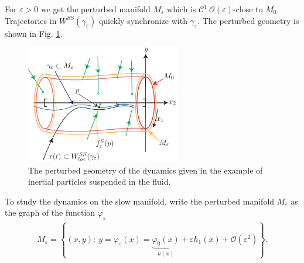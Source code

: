 \begin{ex}
For $\varepsilon>0$ we get the perturbed manifold $M_{\varepsilon}$ which is $\mathcal{C}^{1}\ \mathcal{O}(\varepsilon)$-close to $M_0$. Trajectories in $W^{SS}(\gamma_{\varepsilon})$ quickly synchronize with $\gamma_{\varepsilon}$. The perturbed geometry is shown in Fig. \ref{fig:perturbed_fluid_geometry}.

\begin{figure}[h!]
	\centering
	\includegraphics[width=0.6\textwidth]{figures/ch9/22perturbed_fluid_geometry.pdf}
	\caption{The perturbed geometry of the dynamics given in the example of inertial particles suspended in the fluid.}
	\label{fig:perturbed_fluid_geometry}
\end{figure}

To study the dynamics on the slow manifold, write the perturbed manifold $M_{\varepsilon}$ as the graph of the function $\varphi_{\varepsilon}$
\begin{align}
	M_{\varepsilon} = \left\{ (x,y):\ y=\varphi_{\varepsilon}(x)=\underbrace{\varphi_0(x)}_{u(x)} + \varepsilon h_{1}(x) + \mathcal{O}(\varepsilon^{2}) \right\}.
\end{align}


\end{ex}
